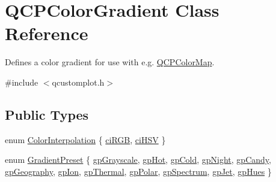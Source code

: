 \hypertarget{class_q_c_p_color_gradient}{}\section{Q\+C\+P\+Color\+Gradient Class Reference}
\label{class_q_c_p_color_gradient}


Defines a color gradient for use with e.\+g. \mbox{\hyperlink{class_q_c_p_color_map}{Q\+C\+P\+Color\+Map}}.  




{\ttfamily \#include $<$qcustomplot.\+h$>$}

\subsection*{Public Types}
\begin{DoxyCompactItemize}
\item 
enum \mbox{\hyperlink{class_q_c_p_color_gradient_ac5dca17cc24336e6ca176610e7f77fc1}{Color\+Interpolation}} \{ \mbox{\hyperlink{class_q_c_p_color_gradient_ac5dca17cc24336e6ca176610e7f77fc1a5e30f725c9cfe93999e268a9f92afbe7}{ci\+R\+GB}}, 
\mbox{\hyperlink{class_q_c_p_color_gradient_ac5dca17cc24336e6ca176610e7f77fc1af14ae62fcae11ecc07234eeaec5856cb}{ci\+H\+SV}}
 \}
\item 
enum \mbox{\hyperlink{class_q_c_p_color_gradient_aed6569828fee337023670272910c9072}{Gradient\+Preset}} \{ \newline
\mbox{\hyperlink{class_q_c_p_color_gradient_aed6569828fee337023670272910c9072add11ae369a86f3b1b6205ec72e5021fb}{gp\+Grayscale}}, 
\mbox{\hyperlink{class_q_c_p_color_gradient_aed6569828fee337023670272910c9072a4f42e534cf6cff5a29a5388094d099b5}{gp\+Hot}}, 
\mbox{\hyperlink{class_q_c_p_color_gradient_aed6569828fee337023670272910c9072aec8c001f62c0d5cb853db5fd85309557}{gp\+Cold}}, 
\mbox{\hyperlink{class_q_c_p_color_gradient_aed6569828fee337023670272910c9072a1bb89351b6def7d220973443fe059c62}{gp\+Night}}, 
\newline
\mbox{\hyperlink{class_q_c_p_color_gradient_aed6569828fee337023670272910c9072a9e72663bf6b94b65945f7843f24e0721}{gp\+Candy}}, 
\mbox{\hyperlink{class_q_c_p_color_gradient_aed6569828fee337023670272910c9072a382f0b07cec1a59d8a533438aea815d2}{gp\+Geography}}, 
\mbox{\hyperlink{class_q_c_p_color_gradient_aed6569828fee337023670272910c9072a4297f4f9e212a819cd65e8e34567182b}{gp\+Ion}}, 
\mbox{\hyperlink{class_q_c_p_color_gradient_aed6569828fee337023670272910c9072af1676b129f9f458ace453f280c731cf7}{gp\+Thermal}}, 
\newline
\mbox{\hyperlink{class_q_c_p_color_gradient_aed6569828fee337023670272910c9072ab7414ce4e36dc3e82e0132a7f0f41b52}{gp\+Polar}}, 
\mbox{\hyperlink{class_q_c_p_color_gradient_aed6569828fee337023670272910c9072ad63adc100ef46f6b4a8a6deacec4642f}{gp\+Spectrum}}, 
\mbox{\hyperlink{class_q_c_p_color_gradient_aed6569828fee337023670272910c9072a5f8a9e67b64c17ddfe4f069fe2b9fb02}{gp\+Jet}}, 
\mbox{\hyperlink{class_q_c_p_color_gradient_aed6569828fee337023670272910c9072a30efe58407acfb67939032f70213a130}{gp\+Hues}}
 \}
\end{DoxyCompactItemize}
